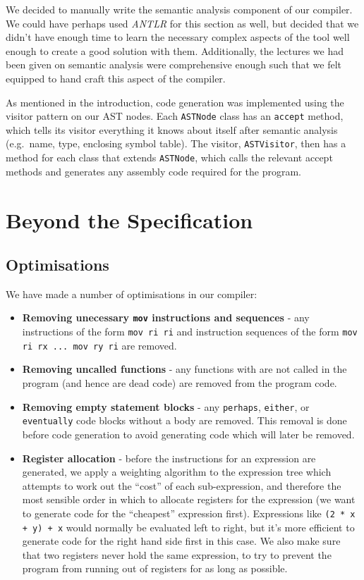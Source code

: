 \documentclass[11pt, notitlepage]{report}
\begin{document}
We decided to manually write the semantic analysis component of our compiler. We could have perhaps used \emph{ANTLR} for this section as well, but decided that we didn't have enough time to learn the necessary complex aspects of the tool well enough to create a good solution with them. Additionally, the lectures we had been given on semantic analysis were comprehensive enough such that we felt equipped to hand craft this aspect of the compiler.

As mentioned in the introduction, code generation was implemented using the visitor pattern on our AST nodes. Each \texttt{ASTNode} class has an \texttt{accept} method, which tells its visitor everything it knows about itself after semantic analysis (e.g.\ name, type, enclosing symbol table). The visitor, \texttt{ASTVisitor}, then has a method for each class that extends \texttt{ASTNode}, which calls the relevant accept methods and generates any assembly code required for the program.

\section*{Beyond the Specification}
\subsection*{Optimisations}
We have made a number of optimisations in our compiler:
\begin{itemize}
\item \textbf{Removing unecessary \texttt{mov} instructions and sequences} - any instructions of the form \texttt{mov ri ri} and instruction sequences of the form \texttt{mov ri rx ... mov ry ri} are removed.
\item \textbf{Removing uncalled functions} - any functions with are not called in the program (and hence are dead code) are removed from the program code.
\item \textbf{Removing empty statement blocks} - any \texttt{perhaps}, \texttt{either}, or \texttt{eventually} code blocks without a body are removed. This removal is done before code generation to avoid generating code which will later be removed.
\item \textbf{Register allocation} - before the instructions for an expression are generated, we apply a weighting algorithm to the expression tree which attempts to work out the ``cost'' of each sub-expression, and therefore the most sensible order in which to allocate registers for the expression (we want to generate code for the ``cheapest'' expression first). Expressions like \texttt{(2 * x + y) + x} would normally be evaluated left to right, but it's more efficient to generate code for the right hand side first in this case. We also make sure that two registers never hold the same expression, to try to prevent the program from running out of registers for as long as possible.
\end{itemize}
\end{document}
